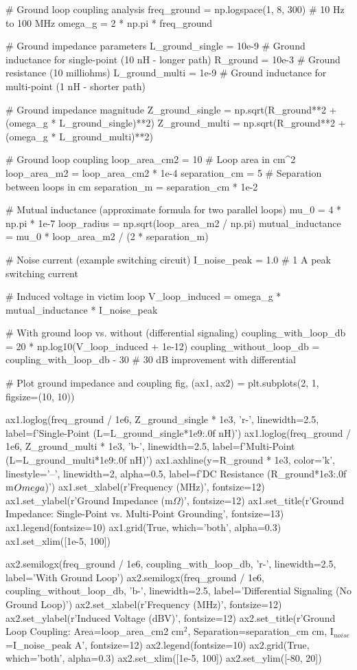 \documentclass[11pt,a4paper]{article}
\begin{document}
\begin{pycode}
# Ground loop coupling analysis
freq_ground = np.logspace(1, 8, 300)  # 10 Hz to 100 MHz
omega_g = 2 * np.pi * freq_ground

# Ground impedance parameters
L_ground_single = 10e-9  # Ground inductance for single-point (10 nH - longer path)
R_ground = 10e-3  # Ground resistance (10 milliohms)
L_ground_multi = 1e-9  # Ground inductance for multi-point (1 nH - shorter path)

# Ground impedance magnitude
Z_ground_single = np.sqrt(R_ground**2 + (omega_g * L_ground_single)**2)
Z_ground_multi = np.sqrt(R_ground**2 + (omega_g * L_ground_multi)**2)

# Ground loop coupling
loop_area_cm2 = 10  # Loop area in cm^2
loop_area_m2 = loop_area_cm2 * 1e-4
separation_cm = 5  # Separation between loops in cm
separation_m = separation_cm * 1e-2

# Mutual inductance (approximate formula for two parallel loops)
mu_0 = 4 * np.pi * 1e-7
loop_radius = np.sqrt(loop_area_m2 / np.pi)
mutual_inductance = mu_0 * loop_area_m2 / (2 * separation_m)

# Noise current (example switching circuit)
I_noise_peak = 1.0  # 1 A peak switching current

# Induced voltage in victim loop
V_loop_induced = omega_g * mutual_inductance * I_noise_peak

# With ground loop vs. without (differential signaling)
coupling_with_loop_db = 20 * np.log10(V_loop_induced + 1e-12)
coupling_without_loop_db = coupling_with_loop_db - 30  # 30 dB improvement with differential

# Plot ground impedance and coupling
fig, (ax1, ax2) = plt.subplots(2, 1, figsize=(10, 10))

ax1.loglog(freq_ground / 1e6, Z_ground_single * 1e3, 'r-', linewidth=2.5, label=f'Single-Point (L={L_ground_single*1e9:.0f} nH)')
ax1.loglog(freq_ground / 1e6, Z_ground_multi * 1e3, 'b-', linewidth=2.5, label=f'Multi-Point (L={L_ground_multi*1e9:.0f} nH)')
ax1.axhline(y=R_ground * 1e3, color='k', linestyle='--', linewidth=2, alpha=0.5, label=f'DC Resistance ({R_ground*1e3:.0f} m$\\Omega$)')
ax1.set_xlabel(r'Frequency (MHz)', fontsize=12)
ax1.set_ylabel(r'Ground Impedance (m$\Omega$)', fontsize=12)
ax1.set_title(r'Ground Impedance: Single-Point vs. Multi-Point Grounding', fontsize=13)
ax1.legend(fontsize=10)
ax1.grid(True, which='both', alpha=0.3)
ax1.set_xlim([1e-5, 100])

ax2.semilogx(freq_ground / 1e6, coupling_with_loop_db, 'r-', linewidth=2.5, label='With Ground Loop')
ax2.semilogx(freq_ground / 1e6, coupling_without_loop_db, 'b-', linewidth=2.5, label='Differential Signaling (No Ground Loop)')
ax2.set_xlabel(r'Frequency (MHz)', fontsize=12)
ax2.set_ylabel(r'Induced Voltage (dBV)', fontsize=12)
ax2.set_title(r'Ground Loop Coupling: Area={loop_area_cm2} cm$^2$, Separation={separation_cm} cm, I$_{{noise}}$={I_noise_peak} A', fontsize=12)
ax2.legend(fontsize=10)
ax2.grid(True, which='both', alpha=0.3)
ax2.set_xlim([1e-5, 100])
ax2.set_ylim([-80, 20])


\end{pycode}
\end{document}
